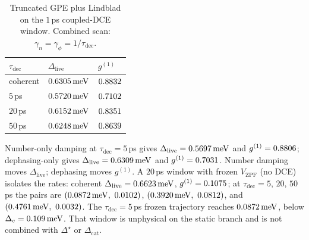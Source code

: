 \begin{table}[htbp]
\centering
\caption{Truncated GPE plus Lindblad on the $1$\,ps coupled-DCE window. Combined scan: $\gamma_n=\gamma_{\phi}=1/\tau_{\mathrm{dec}}$.}
\begin{tabular}{lll}
\hline
$\tau_{\mathrm{dec}}$ & $\Delta_{\mathrm{live}}$ & $g^{(1)}$ \\
\hline
coherent & $0.6305\,\mathrm{meV}$ & $0.8832$ \\
$5$\,ps & $0.5720\,\mathrm{meV}$ & $0.7102$ \\
$20$\,ps & $0.6152\,\mathrm{meV}$ & $0.8351$ \\
$50$\,ps & $0.6248\,\mathrm{meV}$ & $0.8639$ \\
\hline
\end{tabular}
\label{tab:lindblad_1ps}
\end{table}

Number-only damping at $\tau_{\mathrm{dec}}=5$\,ps gives $\Delta_{\mathrm{live}}=0.5697\,\mathrm{meV}$ and $g^{(1)}=0.8806$; dephasing-only gives $\Delta_{\mathrm{live}}=0.6309\,\mathrm{meV}$ and $g^{(1)}=0.7031$. Number damping moves $\Delta_{\mathrm{live}}$; dephasing moves $g^{(1)}$. A $20$\,ps window with frozen $V_{\mathrm{ZPF}}$ (no DCE) isolates the rates: coherent $\Delta_{\mathrm{live}}=0.6623\,\mathrm{meV}$, $g^{(1)}=0.1075$; at $\tau_{\mathrm{dec}}=5$, $20$, $50$\,ps the pairs are $(\Deltafrozentaufive,\ \gofrozentaufive)$, $(\Deltafrozentautwenty,\ \gofrozentautwenty)$, and $(0.4761\,\mathrm{meV},\ 0.0032)$. The $\tau_{\mathrm{dec}}=5$\,ps frozen trajectory reaches $0.0872\,\mathrm{meV}$, below $\Delta_c=0.109\,\mathrm{meV}$. That window is unphysical on the static branch and is not combined with $\Delta^\star$ or $\Delta_{\mathrm{cat}}$.
